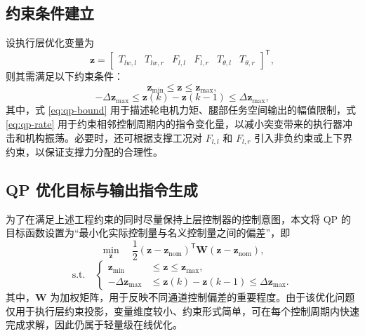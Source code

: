 \subsection{约束条件建立}

设执行层优化变量为
\begin{equation}
  \boldsymbol{z}
  =
  \begin{bmatrix}
    T_{lw,l} &
    T_{lw,r} &
    F_{l,l} &
    F_{l,r} &
    T_{\theta,l} &
    T_{\theta,r}
  \end{bmatrix}^{\mathsf{T}},
  \label{eq:qp-variable}
\end{equation}
则其需满足以下约束条件：
\begin{equation}
  \boldsymbol{z}_{\min} \le \boldsymbol{z} \le \boldsymbol{z}_{\max},
  \label{eq:qp-bound}
\end{equation}
\begin{equation}
  -\Delta \boldsymbol{z}_{\max}
  \le
  \boldsymbol{z}(k) - \boldsymbol{z}(k-1)
  \le
  \Delta \boldsymbol{z}_{\max},
  \label{eq:qp-rate}
\end{equation}
其中，式 \eqref{eq:qp-bound} 用于描述轮电机力矩、腿部任务空间输出的幅值限制，式 \eqref{eq:qp-rate} 用于约束相邻控制周期内的指令变化量，以减小突变带来的执行器冲击和机构振荡。必要时，还可根据支撑工况对 $F_{l,l}$ 和 $F_{l,r}$ 引入非负约束或上下界约束，以保证支撑力分配的合理性。

\subsection{QP 优化目标与输出指令生成}

为了在满足上述工程约束的同时尽量保持上层控制器的控制意图，本文将 QP 的目标函数设置为“最小化实际控制量与名义控制量之间的偏差”，即
\begin{equation}
  \min_{\boldsymbol{z}}
  \quad
  \frac{1}{2}
  \left(
    \boldsymbol{z} - \boldsymbol{z}_{\mathrm{nom}}
  \right)^{\mathsf{T}}
  \boldsymbol{W}
  \left(
    \boldsymbol{z} - \boldsymbol{z}_{\mathrm{nom}}
  \right),
  \label{eq:qp-cost}
\end{equation}
\begin{equation}
  \text{s.t.}\quad
  \left\{
    \begin{aligned}
      \boldsymbol{z}_{\min} &\le \boldsymbol{z} \le \boldsymbol{z}_{\max}, \\
      -\Delta \boldsymbol{z}_{\max}
      &\le
      \boldsymbol{z}(k) - \boldsymbol{z}(k-1)
      \le
      \Delta \boldsymbol{z}_{\max}.
    \end{aligned}
  \right.
  \label{eq:qp-problem}
\end{equation}
其中，$\boldsymbol{W}$ 为加权矩阵，用于反映不同通道控制偏差的重要程度。由于该优化问题仅用于执行层约束投影，变量维度较小、约束形式简单，可在每个控制周期内快速完成求解，因此仍属于轻量级在线优化。


